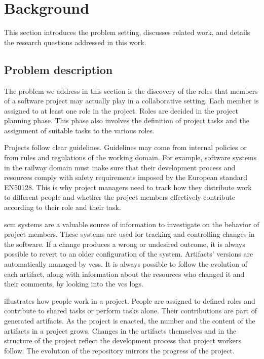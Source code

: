 \section{Background}\label{sec:background}

This section introduces the problem setting, discusses related work, and details the research questions addressed in this work.

\subsection{Problem description}\label{sec:problemDescription}

The problem we address in this section is the discovery of the roles that members of a software project may actually play in a collaborative setting. Each member is assigned to at least one role in the project. Roles are decided in the project planning phase. This phase also involves the definition of project tasks and the assignment of suitable tasks to the various roles. 

Projects follow clear guidelines. Guidelines may come from internal policies or from rules and regulations of the working domain. For example, software systems in the railway domain must make sure that their development process and resources comply with safety requirements imposed by the European standard EN50128. This is why project managers need to track how they distribute work to different people and whether the project members effectively contribute according to their role and their task. 

\Gls*{scm} systems are a valuable source of information to investigate on the behavior of project members. These systems are used for tracking and controlling changes in the software. If a change produces a wrong or undesired outcome, it is always possible to revert to an older configuration of the system. Artifacts' versions are automatically managed by \glspl*{vcs}. It is always possible to follow the evolution of each artifact, along with information about the resources who changed it and their comments, by looking into the \gls*{vcs} logs.

 illustrates how people work in a project. People are assigned to defined roles and contribute to shared tasks or perform tasks alone. Their contributions are part of generated artifacts. As the project is enacted, the number and the content of the artifacts in a project grows. Changes in the artifacts themselves and in the structure of the project reflect the development process that project workers follow. The evolution of the repository mirrors the progress of the project.

